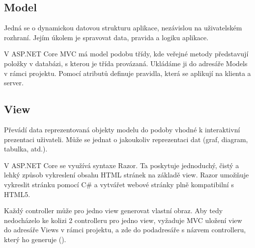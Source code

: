 \documentclass[a4paper, 12pt]{report}
\begin{document}
			\subsection{Model} \label{Model_teorie}
			Jedná se o dynamickou datovou strukturu aplikace, nezávislou na uživatelském rozhraní. Jejím úkolem je spravovat data, pravida a logiku aplikace. \par
			V ASP.NET Core MVC má model podobu třídy, kde veřejné metody představují položky v databázi, s kterou je třída provázaná. Ukládáme ji do adresáře Models v rámci projektu. Pomocí atributů definuje pravidla, která se aplikují na klienta a server.\cite{MVC_Wiki_EN}
			\subsection{View}
			Převádí data reprezentovaná objekty modelu do podoby vhodné k interaktivní prezentaci uživateli.\cite{MVC_Wiki_CZ} Může se jednat o jakoukoliv reprezentaci dat (graf, diagram, tabulka, atd.).\par
			V ASP.NET Core se využívá syntaxe Razor. Ta poskytuje jednoduchý, čistý a lehký způsob vykreslení obsahu HTML stránek na základě view. Razor umožňuje vykreslit stránku pomocí C\# a vytvářet webové stránky plně kompatibilní s HTML5.\cite{MVC_Wiki_EN}\par
			Každý controller může pro jedno view generovat vlastní obraz. Aby tedy nedocházelo ke kolizi 2 controlleru pro jedno view, vyžaduje  MVC uložení view do adresáře Views v rámci projektu, a zde do podadresáře s názvem controlleru, který ho generuje ().
\end{document}
